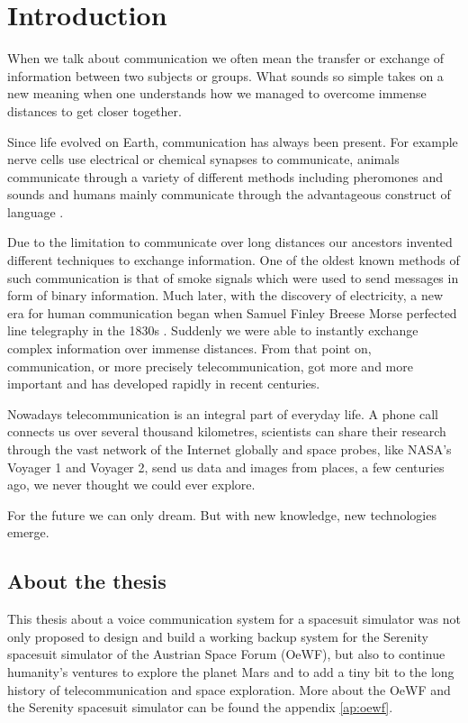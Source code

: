 \chapter{Introduction}
When we talk about communication we often mean the transfer or exchange of information between two subjects or groups. What sounds so simple takes on a new meaning when one understands how we managed to overcome immense distances to get closer together.

Since life evolved on Earth, communication has always been present. For example nerve cells use electrical or chemical synapses to communicate, animals communicate through a variety of different methods including pheromones and sounds and humans mainly communicate through the advantageous construct of language \cite{Christian:2004}.

Due to the limitation to communicate over long distances our ancestors invented different techniques to exchange information. One of the oldest known methods of such communication is that of smoke signals which were used to send messages in form of binary information. Much later, with the discovery of electricity, a new era for human communication began when Samuel Finley Breese Morse perfected line telegraphy in the 1830s \cite{Glover:2010}. Suddenly we were able to instantly exchange complex information over immense distances. From that point on, communication, or more precisely telecommunication, got more and more important and has developed rapidly in recent centuries. 

Nowadays telecommunication is an integral part of everyday life. A phone call connects us over several thousand kilometres, scientists can share their research through the vast network of the Internet globally and space probes, like NASA's Voyager 1 and Voyager 2, send us data and images from places, a few centuries ago, we never thought we could ever explore. 

For the future we can only dream. But with new knowledge, new technologies emerge.

\section{About the thesis}
This thesis about a voice communication system for a spacesuit simulator was not only proposed to design and build a working backup system for the Serenity spacesuit simulator of the Austrian Space Forum (OeWF), but also to continue humanity's ventures to explore the planet Mars and to add a tiny bit to the long history of telecommunication and space exploration. More about the OeWF and the Serenity spacesuit simulator can be found the appendix \ref{ap:oewf}.

